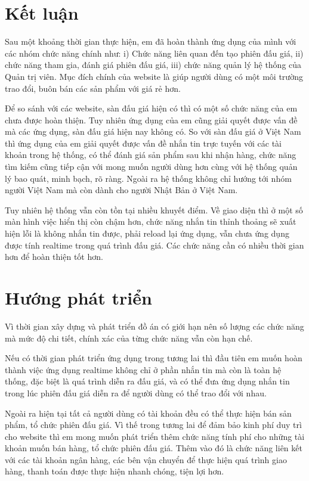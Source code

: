 \documentclass[../DoAn.tex]{subfiles}
\begin{document}
\section{Kết luận}
Sau một khoảng thời gian thực hiện, em đã hoàn thành ứng dụng của mình với các nhóm chức năng chính như: i) Chức năng liên quan đến tạo phiên đấu giá, ii) chức năng tham gia, đánh giá phiên đấu giá, iii) chức năng quản lý hệ thống của Quản trị viên. Mục đích chính của website là giúp người dùng có một môi trường trao đổi, buôn bán các sản phẩm với giá rẻ hơn. 

Để so sánh với các website, sàn đấu giá hiện có thì có một số chức năng của em chưa được hoàn thiện. Tuy nhiên ứng dụng của em cũng giải quyết được vấn đề mà các ứng dụng, sàn đấu giá hiện nay không có. So với sàn đấu giá ở Việt Nam thì ứng dụng của em giải quyết được vấn đề nhắn tin trực tuyến với các tài khoản trong hệ thống, có thể đánh giá sản phẩm sau khi nhận hàng, chức năng tìm kiếm cũng tiếp cận với mong muốn người dùng hơn cùng với hệ thống quản lý bao quát, minh bạch, rõ ràng. Ngoài ra hệ thống không chỉ hướng tới nhóm người Việt Nam mà còn dành cho người Nhật Bản ở Việt Nam.

Tuy nhiên hệ thống vẫn còn tồn tại nhiều khuyết điểm. Về giao diện thì ở một số màn hình việc hiển thị còn chậm hơn, chức năng nhắn tin thỉnh thoảng sẽ xuất hiện lỗi là không nhắn tin được, phải reload lại ứng dụng, vẫn chưa ứng dụng được tính realtime trong quá trình đấu giá. Các chức năng cần có nhiều thời gian hơn để hoàn thiện tốt hơn.
\section{Hướng phát triển}
Vì thời gian xây dựng và phát triển đồ án có giới hạn nên số lượng các chức năng mà mức độ chi tiết, chính xác của từng chức năng vẫn còn hạn chế. 

Nếu có thời gian phát triển ứng dụng trong tương lai thì đầu tiên em muốn hoàn thành việc ứng dụng realtime không chỉ ở phần nhắn tin mà còn là toàn hệ thống, đặc biệt là quá trình diễn ra đấu giá, và có thể đưa ứng dụng nhắn tin trong lúc phiên đấu giá diễn ra để người dùng có thể trao đổi với nhau. 

Ngoài ra hiện tại tất cả người dùng có tài khoản đều có thể thực hiện bán sản phẩm, tổ chức phiên đấu giá. Vì thế trong tương lai để đảm bảo kinh phí duy trì cho website thì em mong muốn phát triển thêm chức năng tính phí cho những tài khoản muốn bán hàng, tổ chức phiên đấu giá. Thêm vào đó là chức năng liên kết với các tài khoản ngân hàng, các bên vận chuyển để thực hiện quá trình giao hàng, thanh toán được thực hiện nhanh chóng, tiện lợi hơn. 
\end{document}
